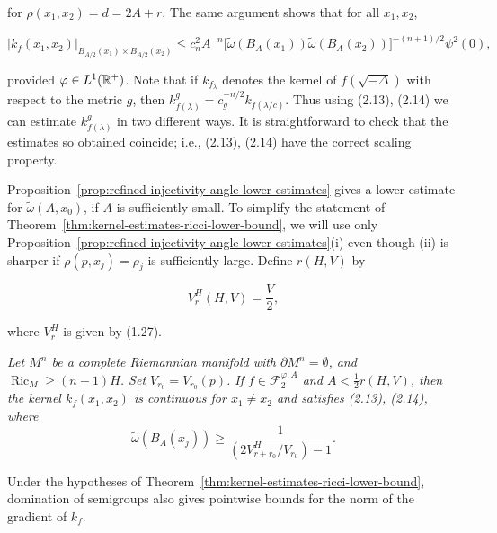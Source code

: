 for $\rho(x_1,x_2)=d=2A+r$. The same argument shows that for all $x_1,x_2$,

\begin{equation}\tag{2.14}
\left|k_f(x_1,x_2)\right|_{B_{A/2}(x_1)\times B_{A/2}(x_2)}
\le c_n^2A^{-n}\bigl[\tilde{\omega}(B_A(x_1))\tilde{\omega}(B_A(x_2))\bigr]^{-(n+1)/2}\psi^2(0),
\end{equation}

provided $\varphi\in L^1(\mathbb{R}^+)$. Note that if $k_{f_\lambda}$ denotes the kernel of
$f(\sqrt{-\Delta})$ with respect to the metric $g$, then
$k^g_{f(\lambda)}=c^{-n/2}_g k_{f(\lambda/c)}$. Thus using (2.13), (2.14) we
can estimate $k^g_{f(\lambda)}$ in two different ways. It is straightforward to
check that the estimates so obtained coincide; i.e., (2.13), (2.14) have the
correct scaling property.

Proposition~\ref{prop:refined-injectivity-angle-lower-estimates} gives a lower estimate for
$\tilde{\omega}(A,x_0)$, if $A$ is sufficiently small. To simplify the statement
of Theorem~\ref{thm:kernel-estimates-ricci-lower-bound}, we will use only Proposition~\ref{prop:refined-injectivity-angle-lower-estimates}(i) even though (ii) is sharper
if $\rho(p,x_j)=\rho_j$ is sufficiently large. Define $r(H,V)$ by

\begin{equation}\tag{2.15}
V_r^H(H,V)=\frac{V}{2},
\end{equation}

where $V_r^H$ is given by (1.27).

\begin{theorem}
\label{thm:kernel-estimates-ricci-lower-bound}

\textit{Let $M^n$ be a complete Riemannian manifold with $\partial M^n=\emptyset$, and $\operatorname{Ric}_M \ge (n-1)H$. Set $V_{r_0}=V_{r_0}(p)$. If $f \in \mathcal{F}^{\varphi,A}_2$ and $A < \frac12 r(H,V)$, then the kernel $k_f(x_1,x_2)$ is continuous for $x_1 \neq x_2$ and satisfies (2.13), (2.14), where}
\begin{equation}\tag{2.16}
\widetilde{\omega}(B_A(x_j)) \ge \frac{1}{\left(2V_{r+r_0}^{H}/V_{r_0}\right)-1}.
\end{equation}
\end{theorem}

\begin{remark}
\label{rem:gradient-kernel-estimate}

Under the hypotheses of Theorem~\ref{thm:kernel-estimates-ricci-lower-bound}, domination of semigroups also gives
pointwise bounds for the norm of the gradient of $k_f$.
\end{remark}

